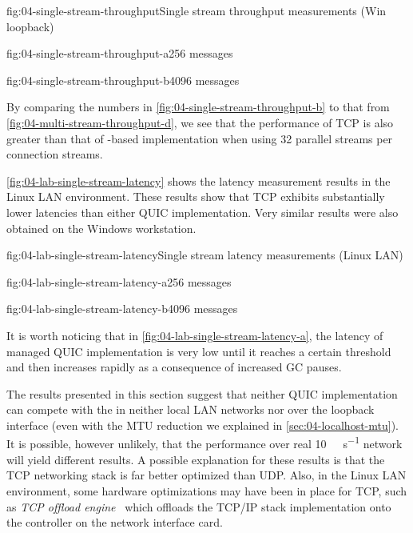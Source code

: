 \begin{myFigure}{fig:04-single-stream-throughput}{Single stream throughput measurements (Win loopback)}
\begin{mySubfigure}{0.49\linewidth}{fig:04-single-stream-throughput-a}{\SI{256}{\byte} messages}
\footnotesize

\end{mySubfigure}
\begin{mySubfigure}{0.49\linewidth}{fig:04-single-stream-throughput-b}{\SI{4096}{\byte} messages}
\footnotesize

\end{mySubfigure}
\end{myFigure}

By comparing the numbers in \autoref{fig:04-single-stream-throughput-b} to that from
\autoref{fig:04-multi-stream-throughput-d}, we see that the performance of TCP is also greater than
that of \libmsquic{}-based implementation when using 32 parallel streams per connection streams.

\autoref{fig:04-lab-single-stream-latency} shows the latency measurement results in the Linux LAN
environment. These results show that TCP exhibits substantially lower latencies than either QUIC
implementation. Very similar results were also obtained on the Windows workstation.

\begin{myFigure}{fig:04-lab-single-stream-latency}{Single stream latency measurements (Linux LAN)}
\begin{mySubfigure}{0.49\linewidth}{fig:04-lab-single-stream-latency-a}{\SI{256}{\byte} messages}
\footnotesize

\end{mySubfigure}
\begin{mySubfigure}{0.49\linewidth}{fig:04-lab-single-stream-latency-b}{\SI{4096}{\byte} messages}
\footnotesize

\end{mySubfigure}
\end{myFigure}

It is worth noticing that in \autoref{fig:04-lab-single-stream-latency-a}, the latency of managed
QUIC implementation is very low until it reaches a certain threshold and then increases rapidly as a
consequence of increased GC pauses.

The results presented in this section suggest that neither QUIC implementation can compete with the
\SslStream{} in neither local LAN networks nor over the loopback interface (even with the MTU
reduction we explained in \autoref{sec:04-localhost-mtu}). It is possible, however unlikely, that
the performance over real \SI[per-mode=symbol]{10}{\giga\bit\per\second} network will yield
different results. A possible explanation for these results is that the TCP networking stack is far
better optimized than UDP\@. Also, in the Linux LAN environment, some hardware optimizations may
have been in place for TCP, such as \textit{TCP offload engine}~\cite{wiki:tcp-offload-engine} which
offloads the TCP/IP stack implementation onto the controller on the network interface card.


